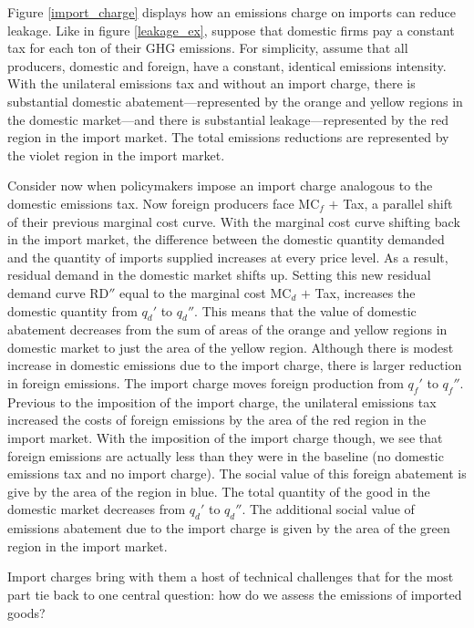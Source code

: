 Figure \ref{import_charge} displays how an emissions charge on imports can reduce leakage. Like in figure \ref{leakage_ex}, suppose that domestic firms pay a constant tax for each ton of their GHG emissions. For simplicity, assume that all producers, domestic and foreign, have a constant, identical emissions intensity. With the unilateral emissions tax and without an import charge, there is substantial domestic abatement---represented by the orange and yellow regions in the domestic market---and there is substantial leakage---represented by the red region in the import market. The total emissions reductions are represented by the violet region in the import market. 

Consider now when policymakers impose an import charge analogous to the domestic emissions tax. Now foreign producers face MC$_f$ $+$ Tax, a parallel shift of their previous marginal cost curve. With the marginal cost curve shifting back in the import market, the difference between the domestic quantity demanded and the quantity of imports supplied increases at every price level. As a result, residual demand in the domestic market shifts up. Setting this new residual demand curve RD$''$ equal to the marginal cost MC$_d$ $+$ Tax, increases the domestic quantity from $q_d'$ to $q_d''$. This means that the value of domestic abatement decreases from the sum of areas of the orange and yellow regions in domestic market to just the area of the yellow region. Although there is modest increase in domestic emissions due to the import charge, there is larger reduction in foreign emissions. The import charge moves foreign production from $q_f'$ to $q_f''$. Previous to the imposition of the import charge, the unilateral emissions tax increased the costs of foreign emissions by the area of the red region in the import market. With the imposition of the import charge though, we see that foreign emissions are actually less than they were in the baseline (no domestic emissions tax and no import charge). The social value of this foreign abatement is give by the area of the region in blue. The total quantity of the good in the domestic market decreases from $q_d'$ to $q_d''$. The additional social value of emissions abatement due to the import charge is given by the area of the green region in the import market.

Import charges bring with them a host of technical challenges that for the most part tie back to one central question: how do we assess the emissions of imported goods? 

